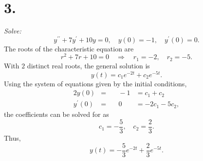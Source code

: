 \documentclass[12pt]{article}
\begin{document}
\section*{3.}
\textit{Solve:}
\begin{equation*}
	y^{\prime\prime} + 7y^\prime + 10y = 0, \quad
	y(0) = -1, \quad
	y^\prime(0) = 0.
\end{equation*}
The roots of the characteristic equation are
\begin{equation*}
	r^2 + 7r + 10 = 0 \quad \Rightarrow \quad r_1 = -2, \quad r_2 = -5.
\end{equation*}
With $2$ distinct real roots, the general solution is
\begin{equation*}
	y(t) = c_1 e^{-2 t} + c_2 e^{-5 t}.
\end{equation*}
Using the system of equations given by the initial conditions,
\begin{alignat*}{2}
	y(0) &=& \quad -1 &= c_1 + c_2 \\
	y^\prime(0) &=& \quad 0 &= -2 c_1 - 5 c_2,
\end{alignat*}
the coefficients can be solved for as
\begin{equation*}
	c_1 = -\frac{5}{3}, \quad
	c_2 = \frac{2}{3}.
\end{equation*}
Thus,
\begin{equation*}
	\boxed{
		y(t) = -\frac{5}{3} e^{-2 t} + \frac{2}{3} e^{-5 t}
	}.
\end{equation*}
\end{document}
